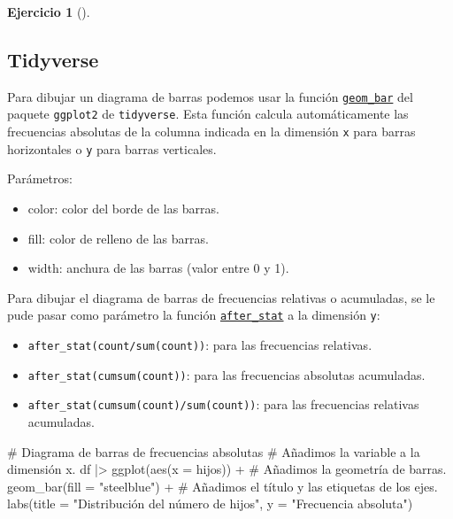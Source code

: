 \documentclass[
  a4paper,
]{scrreport}
\newenvironment{Shaded}{\begin{snugshade}}{\end{snugshade}}
\newcommand{\AttributeTok}[1]{\textcolor[rgb]{0.40,0.45,0.13}{#1}}
\newcommand{\CommentTok}[1]{\textcolor[rgb]{0.37,0.37,0.37}{#1}}
\newcommand{\FunctionTok}[1]{\textcolor[rgb]{0.28,0.35,0.67}{#1}}
\newcommand{\NormalTok}[1]{\textcolor[rgb]{0.00,0.23,0.31}{#1}}
\newcommand{\SpecialCharTok}[1]{\textcolor[rgb]{0.37,0.37,0.37}{#1}}
\newcommand{\StringTok}[1]{\textcolor[rgb]{0.13,0.47,0.30}{#1}}
\providecommand{\tightlist}{%
  \setlength{\itemsep}{0pt}\setlength{\parskip}{0pt}}\usepackage{longtable,booktabs,array}
\theoremstyle{definition}
\newtheorem{exercise}{Ejercicio}[chapter]
\theoremstyle{remark}
\begin{document}
\begin{exercise}[]
\begin{enumerate}
\begin{tcolorbox}
  \section{Tidyverse}

  Para dibujar un diagrama de barras podemos usar la función
  \href{https://aprendeconalf.es/manual-r/07-graficos.html\#diagramas-de-barras}{\texttt{geom\_bar}}
  del paquete \texttt{ggplot2} de \texttt{tidyverse}. Esta función
  calcula automáticamente las frecuencias absolutas de la columna
  indicada en la dimensión \texttt{x} para barras horizontales o
  \texttt{y} para barras verticales.

  Parámetros:

  \begin{itemize}
  \tightlist
  \item
    color: color del borde de las barras.
  \item
    fill: color de relleno de las barras.
  \item
    width: anchura de las barras (valor entre 0 y 1).
  \end{itemize}

  Para dibujar el diagrama de barras de frecuencias relativas o
  acumuladas, se le pude pasar como parámetro la función
  \href{https://ggplot2.tidyverse.org/reference/geom_bar.html}{\texttt{after\_stat}}
  a la dimensión \texttt{y}:

  \begin{itemize}
  \tightlist
  \item
    \texttt{after\_stat(count/sum(count))}: para las frecuencias
    relativas.
  \item
    \texttt{after\_stat(cumsum(count))}: para las frecuencias absolutas
    acumuladas.
  \item
    \texttt{after\_stat(cumsum(count)/sum(count))}: para las frecuencias
    relativas acumuladas.
  \end{itemize}

\begin{Shaded}
\begin{Highlighting}[]
\CommentTok{\# Diagrama de barras de frecuencias absolutas}
\CommentTok{\# Añadimos la variable a la dimensión x.}
\NormalTok{df }\SpecialCharTok{|\textgreater{}} \FunctionTok{ggplot}\NormalTok{(}\FunctionTok{aes}\NormalTok{(}\AttributeTok{x =}\NormalTok{ hijos)) }\SpecialCharTok{+}
    \CommentTok{\# Añadimos la geometría de barras.}
    \FunctionTok{geom\_bar}\NormalTok{(}\AttributeTok{fill =} \StringTok{"steelblue"}\NormalTok{) }\SpecialCharTok{+}
    \CommentTok{\# Añadimos el título y las etiquetas de los ejes. }
    \FunctionTok{labs}\NormalTok{(}\AttributeTok{title =} \StringTok{"Distribución del número de hijos"}\NormalTok{, }\AttributeTok{y =} \StringTok{"Frecuencia absoluta"}\NormalTok{)}
\end{Highlighting}
\end{Shaded}


\end{tcolorbox}
\end{enumerate}
\end{exercise}
\end{document}
